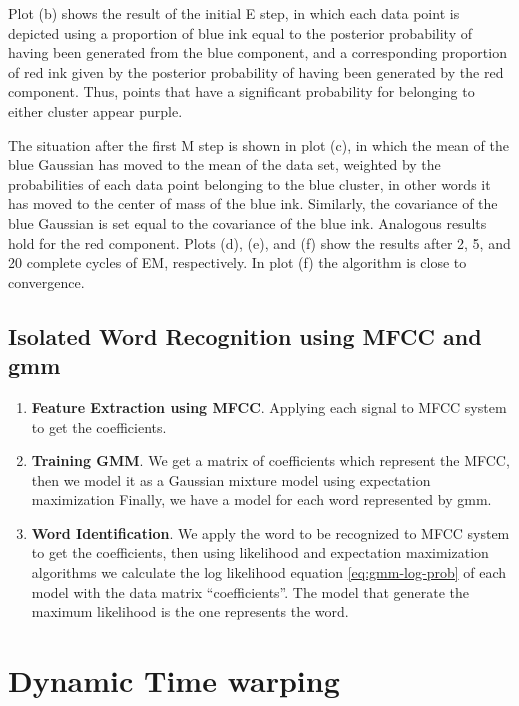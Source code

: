 \documentclass[12pt, a4paper, twoside]{report}
\begin{document}
Plot (b) shows the result of the initial E step, in which each data point is depicted using a proportion of blue ink equal to the posterior probability of having been generated from the blue component, and a corresponding proportion of red ink given by the posterior probability of having been generated by the red component. Thus, points that have a significant probability for belonging to either cluster appear purple.
\par
The situation after the first M step is shown in plot (c), in which the mean of the blue Gaussian has moved to the mean of the data set, weighted by the probabilities of each data point belonging to the blue cluster, in other words it has moved to the center of mass of the blue ink. Similarly, the covariance of the blue Gaussian is set equal to the covariance of the blue ink. Analogous results hold for the red component. Plots (d), (e), and (f) show the results after 2, 5, and 20 complete cycles of EM, respectively. In plot (f) the algorithm is close to convergence.

\subsection{Isolated Word Recognition using MFCC and \acrshort{gmm}}
\begin{enumerate}
\item \textbf{Feature Extraction using MFCC}. Applying each signal to MFCC system to get the coefficients.
\item \textbf{Training GMM}. We get a matrix of coefficients which represent the MFCC, then we model it as a Gaussian mixture model using expectation maximization Finally, we have a model for each word represented by \acrshort{gmm}.
\item \textbf{Word Identification}. We apply the word to be recognized to MFCC system to get the coefficients, then using likelihood and expectation maximization algorithms we calculate the log likelihood equation \ref{eq:gmm-log-prob} of each model with the data matrix ``coefficients''. The model that generate the maximum likelihood is the one represents the word.
\end{enumerate}

\section{Dynamic Time warping}
\end{document}
